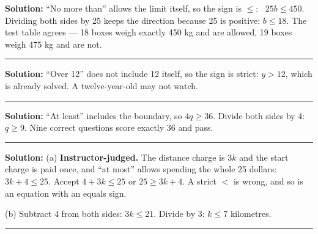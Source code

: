 \documentclass[12pt]{article}
\begin{document}



\textbf{Solution:} ``No more than'' allows the limit itself, so the sign is
$\le$: \ $25b \le 450$. Dividing both sides by 25 keeps the direction because 25
is positive: $b \le 18$. The test table agrees --- 18 boxes weigh exactly 450 kg
and are allowed, 19 boxes weigh 475 kg and are not. 

\vspace{0.25cm}\noindent\rule{\linewidth}{0.2pt}\vspace{0.25cm}


\textbf{Solution:} ``Over 12'' does not include 12 itself, so the sign is
strict: $y > 12$, which is already solved. A twelve-year-old may not
watch. 

\vspace{0.25cm}\noindent\rule{\linewidth}{0.2pt}\vspace{0.25cm}


\textbf{Solution:} ``At least'' includes the boundary, so $4q \ge 36$. Divide
both sides by 4: $q \ge 9$. Nine correct questions score exactly 36 and
pass. 

\vspace{0.25cm}\noindent\rule{\linewidth}{0.2pt}\vspace{0.25cm}


\textbf{Solution:} (a) \textbf{Instructor-judged.} The distance charge is $3k$
and the start charge is paid once, and ``at most'' allows spending the whole 25
dollars: $3k + 4 \le 25$. Accept $4 + 3k \le 25$ or $25 \ge 3k + 4$. A strict
$<$ is wrong, and so is an equation with an equals sign.

(b) Subtract 4 from both sides: $3k \le 21$. Divide by 3:
$k \le 7$ kilometres. 

\vspace{0.25cm}\noindent\rule{\linewidth}{0.2pt}\vspace{0.25cm}

\end{document}
